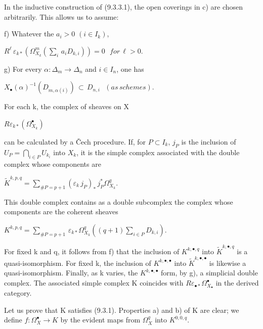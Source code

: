 \documentclass[11pt,twoside]{article}
\newcommand{\DFormula}[1]{%
  \par\smallskip\noindent\hspace*{0pt}\(\displaystyle #1\)\par\smallskip
}
\begin{document}
In the inductive construction of (9.3.3.1), the open coverings in c) are chosen arbitrarily. This allows us to assume:\par
\par\medskip
f) Whatever the \(a_{i}>0\) \((i\in I_{k})\),\par
\par\medskip
\DFormula{R^{\ell }\,\varepsilon _{k\ast }(\Omega _{X_{k}}^{m}(\sum _{i}\,a_{i}D_{k,i}))=0\,\,\,\,for\,\ell >0.}
\par\medskip
g) For every \(\alpha :\Delta _{m}\to \Delta _{n}\) and \(i\in I_{n}\), one has\par
\par\medskip
\DFormula{X_{\bullet }(\alpha )^{−1}(D_{m,\alpha (i)})\,\subset \,D_{n,i}\,\,\,\,(as\,schemes).}
\par\medskip
For each k, the complex of sheaves on X\par
\par\medskip
\DFormula{R\varepsilon _{k\ast }(\Omega _{X_{k}}^{\bullet })}
\par\medskip
can be calculated by a Čech procedure. If, for \(P\subset I_{k}\), \(j_{P}\) is the inclusion of \(U_{P}=⋂_{i\in P}U_{k_{i}}\) into \(X_{k}\), it is the simple complex associated with the double complex whose components are\par
\par\medskip
\DFormula{\widetilde{K}^{k,p,q}=\sum _{\#P=p+1}(\varepsilon _{k}\,j_{P})_{\ast }\,j_{P}^{\ast }\Omega _{X_{k}}^{q}.}
\par\medskip
This double complex contains as a double subcomplex the complex whose components are the coherent sheaves\par
\par\medskip
\DFormula{K^{k,p,q}=\sum _{\#P=p+1}\,\varepsilon _{k\ast }\Omega _{X_{k}}^{q}((q+1)\sum _{i\in P}D_{k,i}).}
\par\medskip
For fixed k and q, it follows from f) that the inclusion of \(K^{k,\bullet ,q}\) into \(\widetilde{K}^{k,\bullet ,q}\) is a quasi-isomorphism. For fixed k, the inclusion of \(K^{k,\bullet ,\bullet }\) into \(\widetilde{K}^{k,\bullet ,\bullet }\) is likewise a quasi-isomorphism. Finally, as k varies, the \(K^{k,\bullet ,\bullet }\) form, by g), a simplicial double complex. The associated simple complex K coincides with \(R\varepsilon _{\bullet \ast }\Omega _{X_{\bullet }}^{\bullet }\) in the derived category.\par
\par\medskip
Let us prove that K satisfies (9.3.1). Properties a) and b) of K are clear; we define \(f:\Omega _{X}^{\bullet }\to K\) by the evident maps from \(\Omega _{X}^{q}\) into \(K^{0,0,q}\).\par
\end{document}
